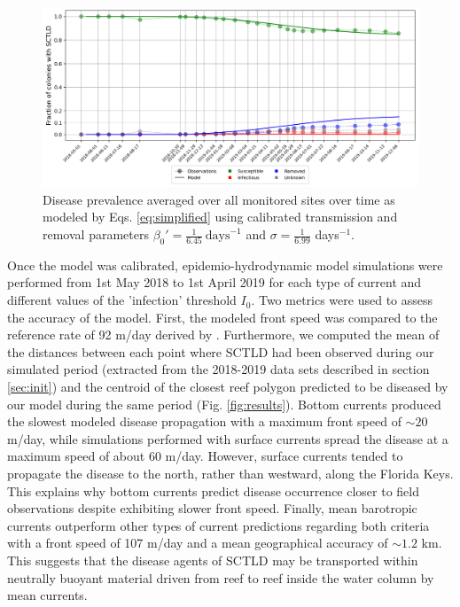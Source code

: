 \begin{figure}
    \centering
    \includegraphics[width=.95\textwidth]{chapters/sctld/figures/sir_obs.jpg}
    \caption{Disease prevalence averaged over all monitored sites over time as modeled by Eqs. \ref{eq:simplified} using calibrated transmission and removal parameters $\beta_0'=\frac{1}{6.45}~\text{days}^{-1}$ and $\sigma=\frac{1}{6.99}$ days$^{-1}$.}
    \label{fig:calibration}
\end{figure}

Once the model was calibrated, epidemio-hydrodynamic model simulations were performed from 1st May 2018 to 1st April 2019 for each type of current and different values of the 'infection' threshold $I_0$. Two metrics were used to assess the accuracy of the model. First, the modeled front speed was compared to the reference rate of 92 m/day derived by \cite{muller2020spatial}. Furthermore, we computed the mean of the distances between each point where SCTLD had been observed during our simulated period (extracted from the 2018-2019 data sets described in section \ref{sec:init}) and the centroid of the closest reef polygon predicted to be diseased by our model during the same period (Fig. \ref{fig:results}). Bottom currents produced the slowest modeled disease propagation with a maximum front speed of $\sim 20$ m/day, while simulations performed with surface currents spread the disease at a maximum speed of about 60 m/day. However, surface currents tended to propagate the disease to the north, rather than westward, along the Florida Keys. This explains why bottom currents predict disease occurrence closer to field observations despite exhibiting slower front speed. Finally, mean barotropic currents outperform other types of current predictions regarding both criteria with a front speed of 107 m/day and a mean geographical accuracy of $\sim1.2$ km. This suggests that the disease agents of SCTLD may be transported within neutrally buoyant material driven from reef to reef inside the water column by mean currents.

